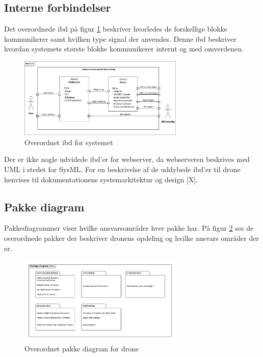 \subsection{Interne forbindelser}

Det overordnede ibd på figur \ref{fig:ibd_asd} beskriver hvorledes de forskellige blokke kommunikerer samt hvilken type signal der anvendes.
Denne ibd beskriver hvordan systemets største blokke kommunikerer internt og med omverdenen. 

\begin{figure}[H]
	\centering
	\includegraphics[width=0.7\textwidth]{Billeder/Projektbeskrivelse/ibd1_overordnet.pdf}
	\caption{Overordnet ibd for systemet}
	\label{fig:ibd_asd}
\end{figure}

Der er ikke nogle udvidede ibd'er for webserver, da webserveren beskrives med UML i stedet for SysML. 
For en beskrivelse af de uddybede ibd'er til drone henvises til dokumentationens systemarkitektur og design [X].

\subsection{Pakke diagram}

Pakkediagrammer viser hvilke ansvarsområder hver pakke har.
På figur \ref{fig:package_drone} ses de overordnede pakker der beskriver dronens opdeling og hvilke ansvars områder der er.

\begin{figure}[H]
	\centering
	\includegraphics[width=0.7\textwidth]{Billeder/Projektbeskrivelse/Packagediagram_drone}
	\caption{Overordnet pakke diagram for drone}
	\label{fig:package_drone}
\end{figure}



